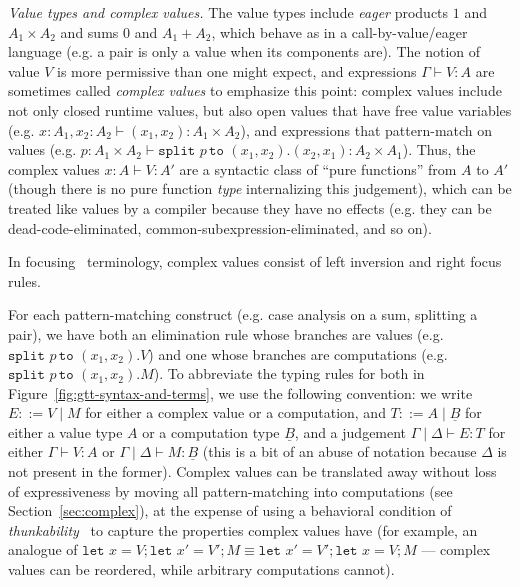 \documentclass[acmsmall,nonacm]{acmart}
\renewcommand{\u}{\underline}
\newcommand{\lett}{\kw{let}}
\newcommand{\letXbeYinZ}[2]{\lett#2 = #1;}
\newcommand{\kw}[1]{\texttt{#1}\,\,}
\newcommand{\pmpairWtoXYinZ}[4]{\kw{split} #1\,\kw{to} (#2,#3). #4}
\begin{document}
\emph{Value types and complex values.}
The value types include \emph{eager} products $1$ and $A_1 \times A_2$
and sums $0$ and $A_1 + A_2$, which behave as in a call-by-value/eager
language (e.g. a pair is only a value when its components are).  The
notion of value $V$ is more permissive than one might expect, and
expressions $\Gamma \vdash V : A$ are sometimes called \emph{complex
  values} to emphasize this point: complex values include not only
closed runtime values, but also open values that have free value
variables (e.g. $x : A_1 , x_2 : A_2 \vdash (x_1,x_2) : A_1 \times
A_2$), and expressions that pattern-match on values (e.g. $p : A_1
\times A_2 \vdash \pmpairWtoXYinZ{p}{x_1}{x_2}{(x_2,x_1)} : A_2 \times
A_1$).  Thus, the complex values $x : A \vdash V : A'$ are a syntactic
class of ``pure functions'' from $A$ to $A'$ (though there is no pure
function \emph{type} internalizing this judgement), which can be treated
like values by a compiler because they have no effects (e.g. they can be
dead-code-eliminated, common-subexpression-eliminated, and so on).
\begin{longonly}
In focusing~\cite{andreoli92focus} terminology, complex
values consist of left inversion and right focus rules.
\end{longonly}
For each pattern-matching construct (e.g. case analysis on a sum,
splitting a pair), we have both an elimination rule whose branches are
values (e.g. $\pmpairWtoXYinZ{p}{x_1}{x_2}{V}$) and one whose branches
are computations (e.g. $\pmpairWtoXYinZ{p}{x_1}{x_2}{M}$).  To
abbreviate the typing rules for both in
Figure~\ref{fig:gtt-syntax-and-terms}, we use the following convention:
we write $E ::= V \mid M$ for either a complex value or a computation,
and $T ::= A \mid \u B$ for either a value type $A$ or a computation
type $\u B$, and a judgement $\Gamma \mid \Delta \vdash E : T$ for
either $\Gamma \vdash V : A$ or $\Gamma \mid \Delta \vdash M : \u B$
(this is a bit of an abuse of notation because $\Delta$ is not present
in the former).  Complex values can be translated away without loss of
expressiveness by moving all pattern-matching into computations (see
Section~\ref{sec:complex}), at the expense of using a behavioral
condition of \emph{thunkability}~\cite{munchmaccagnoni14nonassociative} to capture the properties
complex values have (for example, an analogue of
$\letXbeYinZ{V}{x}{\letXbeYinZ{V'}{x'}{M}} \equiv
\letXbeYinZ{V'}{x'}{\letXbeYinZ{V}{x}{M}}$ --- complex values can be
reordered, while arbitrary computations cannot).  
\end{document}
